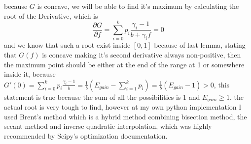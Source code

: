 \documentclass{article}
\newcommand{\pdiv}[2]{{\frac{\partial#1}{\partial#2}}}
\begin{document}
	because $G$ is concave, we will be able to find it's maximum by calculating the root of the Derivative, which is 
	\[\pdiv{G}{f} = \sum_{i=0}^{k} p_i \frac{\gamma_i - 1}{b+\gamma_i f} = 0\] 
	and we know that such a root exist inside $[0,1]$ because of last lemma, stating that $G(f)$ is concave making it's second derivative always non-positive, then the maximum point should be either at the end of the range at 1 or somewhere inside it, because $G'(0) = \sum_{i=0}^{k} p_i \frac{\gamma_i - 1}{b} = \frac{1}{b}(E_{gain} - \sum_{i = 1}^{k} p_i) = \frac{1}{b}(E_{gain} - 1) > 0$, this statement is true because the sum of all the possibilities is $1$ and $E_{gain} \ge 1$.
	\newline
	the actual root is very tough to find, however at my own python implementation I used Brent's method which is a hybrid method combining bisection method, the secant method and inverse quadratic interpolation, which was highly recommended by Scipy's optimization documentation.
	\newline
\end{document}
